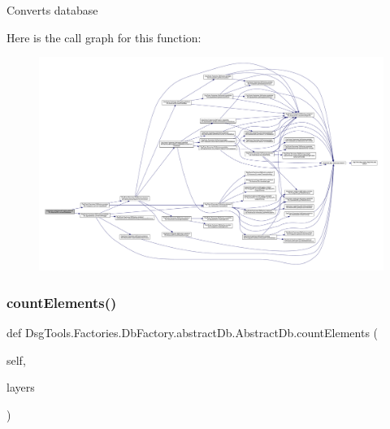 \begin{DoxyVerb}Converts database
\end{DoxyVerb}
 Here is the call graph for this function\+:
\nopagebreak
\begin{figure}[H]
\begin{center}
\leavevmode
\includegraphics[width=350pt]{class_dsg_tools_1_1_factories_1_1_db_factory_1_1abstract_db_1_1_abstract_db_af2cfa7cec72d89c8bff648a1ef6fd895_cgraph}
\end{center}
\end{figure}
\mbox{\label{class_dsg_tools_1_1_factories_1_1_db_factory_1_1abstract_db_1_1_abstract_db_a4cc7881313a6c579d07c1209739856cb}} 
\subsubsection{\texorpdfstring{count\+Elements()}{countElements()}}
{\footnotesize\ttfamily def Dsg\+Tools.\+Factories.\+Db\+Factory.\+abstract\+Db.\+Abstract\+Db.\+count\+Elements (\begin{DoxyParamCaption}\item[{}]{self,  }\item[{}]{layers }\end{DoxyParamCaption})}


